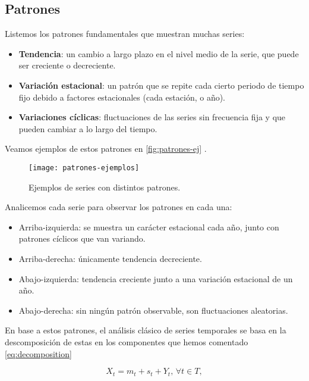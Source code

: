 \subsection{Patrones}

Listemos los patrones fundamentales que muestran muchas series:

\begin{itemize}
  \item \textbf{Tendencia}: un cambio a largo plazo en el nivel medio de la serie, que puede ser creciente o decreciente.
  \item \textbf{Variación estacional}: un patrón que se repite cada cierto periodo de tiempo fijo debido a factores estacionales (cada estación, o año).
  \item \textbf{Variaciones cíclicas}: fluctuaciones de las series sin frecuencia fija y que pueden cambiar a lo largo del tiempo.
\end{itemize}

Veamos ejemplos de estos patrones en \autoref{fig:patrones-ej} \cite{hyndman2018forecasting}.

\begin{figure}[htpb]
  \centering
  \texttt{[image: patrones-ejemplos]}
  \caption{Ejemplos de series con distintos patrones.}
  \label{fig:patrones-ej}
\end{figure}

Analicemos cada serie para observar los patrones en cada una:

\begin{itemize}
  \item Arriba-izquierda: se muestra un carácter estacional cada año, junto con patrones cíclicos que van variando.
  \item Arriba-derecha: únicamente tendencia decreciente.
  \item Abajo-izquierda: tendencia creciente junto a una variación estacional de un año.
  \item Abajo-derecha: sin ningún patrón observable, son fluctuaciones aleatorias.
\end{itemize}

En base a estos patrones, el análisis clásico de series temporales se basa en la descomposición de estas en los componentes que hemos comentado \eqref{eq:decomposition}

\begin{equation}
  X_t = m_t + s_t + Y_t, \, \forall t \in T,
  \label{eq:decomposition}
\end{equation}

